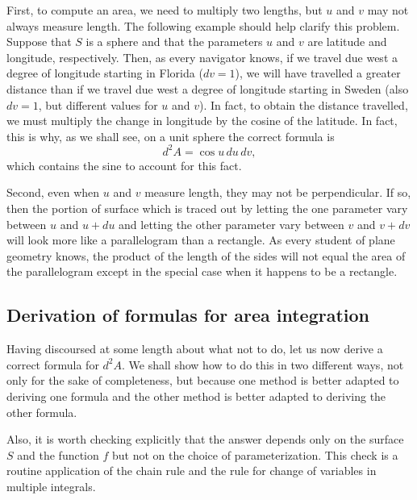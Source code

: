 \documentclass[12pt]{article}
\begin{document}
First, to compute an area, we need to multiply two lengths, but $u$ and $v$ may not always measure length.  The following example should help clarify this problem.  Suppose that $S$ is a sphere and that the parameters $u$ and $v$ are latitude and longitude, respectively.  Then, as every navigator knows, if we travel due west a degree of longitude starting in Florida ($dv = 1$), we will have travelled a greater distance than if we travel due west a degree of longitude starting in Sweden (also $dv = 1$, but different values for $u$ and $v$).  In fact, to obtain the distance travelled, we must multiply the change in longitude by the cosine of the latitude.  In fact, this is why, as we shall see, on a unit sphere the correct formula is
 $$d^2 A = \cos u \, du \, dv,$$
which contains the sine to account for this fact.

Second, even when $u$ and $v$ measure length, they may not be perpendicular.  If so, then the portion of surface which is traced out by letting the one parameter vary between $u$ and $u + du$ and letting the other parameter vary between $v$ and $v + dv$ will look more like a parallelogram than a rectangle.  As every student of plane geometry knows, the product of the length of the sides will not equal the area of the parallelogram except in the special case when it happens to be a rectangle.

\subsection{Derivation of formulas for area integration}

Having discoursed at some length about what not to do, let us now derive a correct formula for $d^2 A$.  We shall show how to do this in two different ways, not only for the sake of completeness, but because one method is better adapted to deriving one formula and the other method is better adapted to deriving the other formula.

Also, it is worth checking explicitly that the answer depends only on the surface $S$ and the function $f$ but not on the choice of parameterization.  This check is a routine application of the chain rule and the rule for change of variables in multiple integrals.
\end{document}
